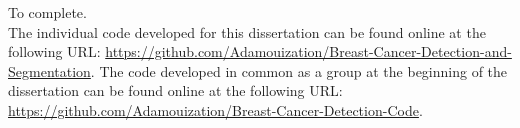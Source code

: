 To complete.\\

The individual code developed for this dissertation can be found online at the following URL: \url{https://github.com/Adamouization/Breast-Cancer-Detection-and-Segmentation}. The code developed in common as a group at the beginning of the dissertation can be found online at the following URL: \url{https://github.com/Adamouization/Breast-Cancer-Detection-Code}.
